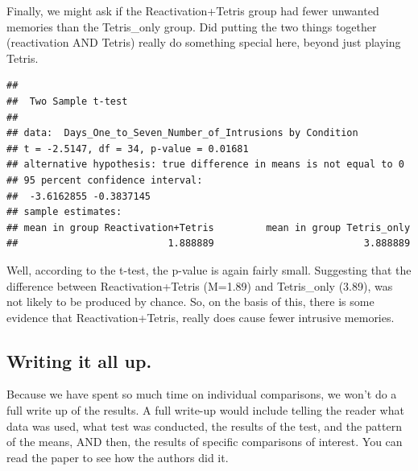 \documentclass[]{book}
\newenvironment{Shaded}{\begin{snugshade}}{\end{snugshade}}
\newcommand{\KeywordTok}[1]{\textcolor[rgb]{0.13,0.29,0.53}{\textbf{{#1}}}}
\newcommand{\DataTypeTok}[1]{\textcolor[rgb]{0.13,0.29,0.53}{{#1}}}
\newcommand{\StringTok}[1]{\textcolor[rgb]{0.31,0.60,0.02}{{#1}}}
\newcommand{\OtherTok}[1]{\textcolor[rgb]{0.56,0.35,0.01}{{#1}}}
\newcommand{\NormalTok}[1]{{#1}}
\theoremstyle{definition}
\theoremstyle{definition}
\theoremstyle{definition}
\theoremstyle{remark}
\begin{document}
Finally, we might ask if the Reactivation+Tetris group had fewer
unwanted memories than the Tetris\_only group. Did putting the two
things together (reactivation AND Tetris) really do something special
here, beyond just playing Tetris.

\begin{Shaded}
\end{Shaded}

\begin{verbatim}
## 
##  Two Sample t-test
## 
## data:  Days_One_to_Seven_Number_of_Intrusions by Condition
## t = -2.5147, df = 34, p-value = 0.01681
## alternative hypothesis: true difference in means is not equal to 0
## 95 percent confidence interval:
##  -3.6162855 -0.3837145
## sample estimates:
## mean in group Reactivation+Tetris         mean in group Tetris_only 
##                          1.888889                          3.888889
\end{verbatim}

Well, according to the t-test, the p-value is again fairly small.
Suggesting that the difference between Reactivation+Tetris (M=1.89) and
Tetris\_only (3.89), was not likely to be produced by chance. So, on the
basis of this, there is some evidence that Reactivation+Tetris, really
does cause fewer intrusive memories.

\subsection{Writing it all up.}\label{writing-it-all-up.}

Because we have spent so much time on individual comparisons, we won't
do a full write up of the results. A full write-up would include telling
the reader what data was used, what test was conducted, the results of
the test, and the pattern of the means, AND then, the results of
specific comparisons of interest. You can read the paper to see how the
authors did it.
\end{document}
